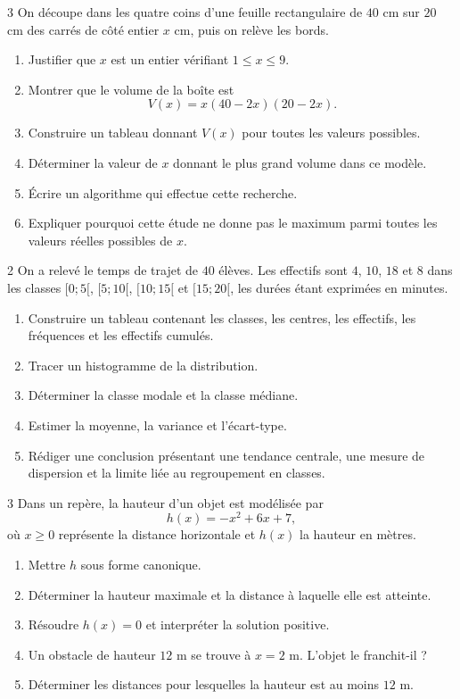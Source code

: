 \begin{probleme}{3}
On découpe dans les quatre coins d'une feuille rectangulaire de
$40$ cm sur $20$ cm des carrés de côté entier $x$ cm, puis on relève les bords.
\begin{enumerate}
  \item Justifier que $x$ est un entier vérifiant $1\leq x\leq9$.
  \item Montrer que le volume de la boîte est
  \[
    V(x)=x(40-2x)(20-2x).
  \]
  \item Construire un tableau donnant $V(x)$ pour toutes les valeurs possibles.
  \item Déterminer la valeur de $x$ donnant le plus grand volume dans ce modèle.
  \item Écrire un algorithme qui effectue cette recherche.
  \item Expliquer pourquoi cette étude ne donne pas le maximum parmi toutes
  les valeurs réelles possibles de $x$.
\end{enumerate}
\end{probleme}

\begin{probleme}{2}
On a relevé le temps de trajet de $40$ élèves. Les effectifs sont $4$, $10$,
$18$ et $8$ dans les classes $[0;5[$, $[5;10[$, $[10;15[$ et $[15;20[$,
les durées étant exprimées en minutes.
\begin{enumerate}
  \item Construire un tableau contenant les classes, les centres, les effectifs,
  les fréquences et les effectifs cumulés.
  \item Tracer un histogramme de la distribution.
  \item Déterminer la classe modale et la classe médiane.
  \item Estimer la moyenne, la variance et l'écart-type.
  \item Rédiger une conclusion présentant une tendance centrale, une mesure de
  dispersion et la limite liée au regroupement en classes.
\end{enumerate}
\end{probleme}

\begin{probleme}{3}
Dans un repère, la hauteur d'un objet est modélisée par
\[
  h(x)=-x^2+6x+7,
\]
où $x\geq0$ représente la distance horizontale et $h(x)$ la hauteur en mètres.
\begin{enumerate}
  \item Mettre $h$ sous forme canonique.
  \item Déterminer la hauteur maximale et la distance à laquelle elle est atteinte.
  \item Résoudre $h(x)=0$ et interpréter la solution positive.
  \item Un obstacle de hauteur $12$ m se trouve à $x=2$ m. L'objet le franchit-il ?
  \item Déterminer les distances pour lesquelles la hauteur est au moins $12$ m.
\end{enumerate}
\end{probleme}

